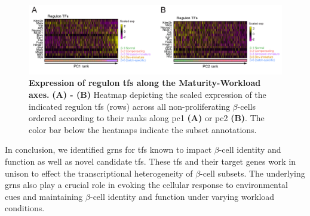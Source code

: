 \begin{figure}[t]
    \centering
    \includegraphics[width=\linewidth]{Chapter5/Fig/F3-19-01.png}
    \caption[Expression of regulons along the Maturity-Workload axes]{\textbf{Expression of regulon \glspl{tf} along the Maturity-Workload axes.} \textbf{(A) - (B)} Heatmap depicting the scaled expression of the indicated regulon \glspl{tf} (rows) across all non-proliferating $\beta$-cells ordered according to their ranks along \gls{pc}1 \textbf{(A)} or \gls{pc}2 \textbf{(B)}. The color bar below the heatmaps indicate the subset annotations. }
    \label{fig:chp3_TFgenes}
\end{figure}

\par In conclusion, we identified \glspl{grn} for \glspl{tf} known to impact $\beta$-cell identity and function as well as novel candidate \glspl{tf}. These \glspl{tf} and their target genes work in unison to effect the transcriptional heterogeneity of $\beta$-cell subsets. The underlying \glspl{grn} also play a crucial role in evoking the cellular response to environmental cues and maintaining $\beta$-cell identity and function under varying workload conditions.



